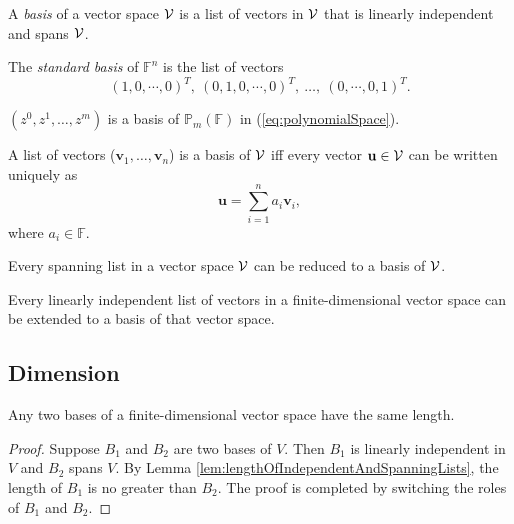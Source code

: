 \begin{defn}
  \label{defn:basis}
  A \emph{basis} of a vector space ${\cal V}$ 
  is a list of vectors in ${\cal V}$ 
  that is linearly independent
  and spans ${\cal V}$.
\end{defn}

\begin{defn}
  \label{def:standardBasis}
  The \emph{standard basis} of $\mathbb{F}^n$ is the list of vectors
  \begin{equation}
    \label{eq:standardBasis}
    (1,0,\cdots,0)^T,\  (0,1,0,\cdots,0)^T,\ 
    \ldots,\ (0,\cdots,0, 1)^T.
  \end{equation}
\end{defn}

\begin{exm}
  $(z^0, z^1, \ldots, z^m)$ is
  a basis of $\mathbb{P}_m(\mathbb{F})$
  in (\ref{eq:polynomialSpace}).
\end{exm}

\begin{lem}
  A list of vectors ($\mathbf{v}_1, \ldots, \mathbf{v}_n$) is
  a basis of ${\cal V}$ iff every vector $\mathbf{u}\in {\cal V}$
  can be written uniquely as
  \begin{equation}
    \label{eq:basis}
    \mathbf{u} = \sum_{i=1}^n a_i \mathbf{v}_i,
  \end{equation}
  where $a_i\in \mathbb{F}$.
\end{lem}

\begin{lem}
  Every spanning list in a vector space ${\cal V}$ can be reduced
  to a basis of ${\cal V}$.
\end{lem}

\begin{lem}
  \label{lem:linearIndependentListExtendableToBasis}
  Every linearly independent list of vectors
  in a finite-dimensional vector space
  can be extended to a basis of that vector space.
\end{lem}


\subsection{Dimension}

\begin{lem}
  Any two bases of a finite-dimensional vector space
  have the same length.
\end{lem}
\begin{proof}
  Suppose $B_1$ and $B_2$ are two bases of $V$.
  Then $B_1$ is linearly independent in $V$
  and $B_2$ spans $V$.
  By Lemma \ref{lem:lengthOfIndependentAndSpanningLists},
  the length of $B_1$ is no greater than $B_2$.
  The proof is completed by switching
  the roles of $B_1$ and $B_2$.
\end{proof}


